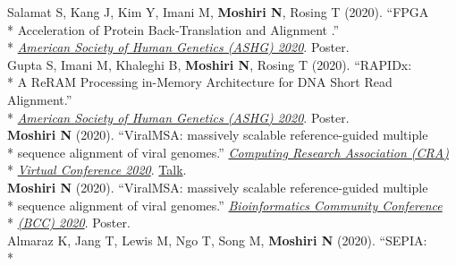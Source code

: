 \documentclass[margin,line]{res}
\begin{document}
\begin{resume}
\hspace*{4mm} Salamat S, Kang J, Kim Y, Imani M, \textbf{Moshiri N}, Rosing T (2020). ``FPGA\\*
\hspace*{9mm} Acceleration of Protein Back-Translation and Alignment
.''\\*\vspace{2mm}
\hspace*{7mm} \href{https://www.ashg.org/meetings/2020meeting}{\textit{American Society of Human Genetics (ASHG) 2020}}. Poster.\\
\hspace*{4mm} Gupta S, Imani M, Khaleghi B, \textbf{Moshiri N}, Rosing T (2020). ``RAPIDx:\\*
\hspace*{9mm} A ReRAM Processing in-Memory Architecture for DNA Short Read Alignment.''\\*\vspace{2mm}
\hspace*{7mm} \href{https://www.ashg.org/meetings/2020meeting}{\textit{American Society of Human Genetics (ASHG) 2020}}. Poster.\\
\hspace*{4mm} \textbf{Moshiri N} (2020). ``ViralMSA: massively scalable reference-guided multiple\\*
\hspace*{9mm} sequence alignment of viral genomes.'' \href{https://cra.org/events/cra-virtual-conference-2020/}{\textit{Computing Research Association (CRA)}}\\*\vspace{2mm}
\hspace*{8mm} \href{https://cra.org/events/cra-virtual-conference-2020/}{\textit{Virtual Conference 2020}}. \href{https://www.youtube.com/watch?v=PrAoks7OhE8&list=PL6AeXx75lHyyqKgfRmlSM4QUEna0dWDza&index=9&t=0s}{Talk}.\\
\hspace*{4mm} \textbf{Moshiri N} (2020). ``ViralMSA: massively scalable reference-guided multiple\\*
\hspace*{9mm} sequence alignment of viral genomes.'' \href{https://bcc2020.github.io/}{\textit{Bioinformatics Community Conference}}\\*\vspace{2mm}
\hspace*{8mm} \href{https://bcc2020.github.io/}{\textit{(BCC) 2020}}. Poster.\\
\hspace*{4mm} Almaraz K, Jang T, Lewis M, Ngo T, Song M, \textbf{Moshiri N} (2020). ``SEPIA:\\*

\end{resume}
\end{document}
